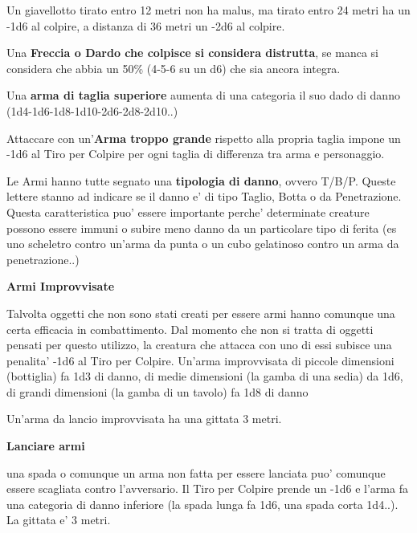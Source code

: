 \documentclass[a4paper,11pt,twoside,openany]{book}
\begin{document}
{Un giavellotto tirato entro 12 metri non ha malus, ma tirato entro 24 metri ha un -1d6 al colpire, a distanza di 36 metri un -2d6 al colpire.

\medskip


Una \textbf{Freccia o Dardo che colpisce si considera distrutta}, se manca si considera che abbia un 50\% (4-5-6 su un d6) che sia ancora integra.

\medskip

Una \textbf{arma di taglia superiore} aumenta di una categoria il suo dado di danno (1d4-1d6-1d8-1d10-2d6-2d8-2d10..)

\medskip

Attaccare con un'\textbf{Arma troppo grande} rispetto alla propria taglia impone un -1d6 al Tiro per Colpire per ogni taglia di differenza tra arma e personaggio.

\medskip

Le Armi hanno tutte segnato una \textbf{tipologia di danno}, ovvero T/B/P. 	Queste lettere stanno ad indicare se il danno e' di tipo Taglio, Botta 	o da Penetrazione. Questa caratteristica puo' essere importante perche' 	determinate creature possono essere immuni o subire meno danno da 	un particolare tipo di ferita (es uno scheletro contro un'arma da 	punta o un cubo gelatinoso contro un arma da penetrazione..)

\medskip

\textbf{Armi Improvvisate}
	
Talvolta oggetti che non sono stati creati per essere armi hanno comunque una certa efficacia in combattimento. Dal momento che non si tratta di oggetti pensati per questo utilizzo, la creatura che attacca con uno di essi subisce una penalita' -1d6 al Tiro per Colpire. Un'arma improvvisata di piccole dimensioni (bottiglia) fa 1d3 di danno, di medie dimensioni (la gamba di una sedia) da 1d6, di grandi dimensioni (la gamba di un tavolo) fa 1d8 di danno
	
Un'arma da lancio improvvisata ha una gittata 3 metri.

\medskip

\textbf{Lanciare armi}
	
una spada o comunque un arma non fatta per essere lanciata puo' comunque essere scagliata contro l'avversario. Il Tiro per Colpire prende un -1d6 e l'arma fa una categoria di danno inferiore (la spada lunga fa 1d6, una spada corta 1d4..). La gittata e' 3 metri.

}
\end{document}
